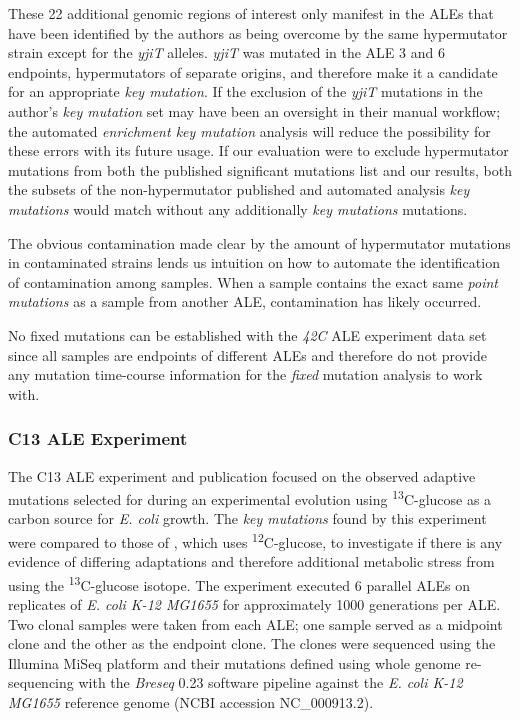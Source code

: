 \documentclass[12pt,final,masters,chapterheads]{ucsd}  %
\begin{document}
These 22 additional genomic regions of interest only manifest in the ALEs that have been identified by the authors as being overcome by the same hypermutator strain except for the \textit{yjiT} alleles. \textit{yjiT} was mutated in the ALE 3 and 6 endpoints, hypermutators of separate origins, and therefore make it a candidate for an appropriate \textit{key mutation}. If the exclusion of the \textit{yjiT} mutations in the author's \textit{key mutation} set may have been an oversight in their manual workflow; the automated \textit{enrichment key mutation} analysis will reduce the possibility for these errors with its future usage. If our evaluation were to exclude hypermutator mutations from both the published significant mutations list and our results, both the subsets of the non-hypermutator published and automated analysis \textit{key mutations} would match without any additionally \textit{key mutations} mutations. 

The obvious contamination made clear by the amount of hypermutator mutations in contaminated strains lends us intuition on how to automate the identification of contamination among samples. When a sample contains the exact same \textit{point mutations} as a sample from another ALE, contamination has likely occurred.

No fixed mutations can be established with the \textit{42C} ALE experiment data set since all samples are endpoints of different ALEs and therefore do not provide any mutation time-course information for the \textit{fixed} mutation analysis to work with.
\subsubsection{C13 ALE Experiment}
The C13 ALE experiment and publication focused on the observed adaptive mutations selected for during an experimental evolution using \textsuperscript{13}C-glucose as a carbon source for \textit{E. coli} growth. The \textit{key mutations} found by this experiment were compared to those of \cite{pmid25304508}, which uses \textsuperscript{12}C-glucose, to investigate if there is any evidence of differing adaptations and therefore additional metabolic stress from using the \textsuperscript{13}C-glucose isotope. The experiment executed 6 parallel ALEs  on replicates of \textit{E. coli K-12 MG1655} for approximately 1000 generations per ALE. Two clonal samples were taken from each ALE; one sample served as a midpoint clone and the other as the endpoint clone. The clones were sequenced using the Illumina MiSeq platform and their mutations defined using whole genome re-sequencing with the \textit{Breseq} 0.23 software pipeline against the \textit{E. coli K-12 MG1655} reference genome (NCBI accession NC\_000913.2).
\end{document}

